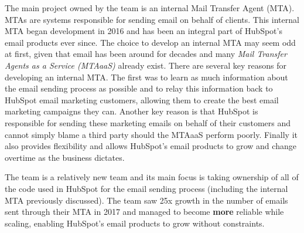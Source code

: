 The main project owned by the \team{} team is an internal Mail Transfer Agent (MTA). MTAs are systems responsible for sending email on behalf of clients. This internal MTA began development in 2016 and has been an integral part of HubSpot's email products ever since. The choice to develop an internal MTA may seem odd at first, given that email has been around for decades and many \textit{Mail Transfer Agents as a Service (MTAaaS)} already exist. There are several key reasons for developing an internal MTA. The first was to learn as much information about the email sending process as possible and to relay this information back to HubSpot email marketing customers, allowing them to create the best email marketing campaigns they can. Another key reason is that HubSpot is responsible for sending these marketing emails on behalf of their customers and cannot simply blame a third party should the MTAaaS perform poorly. Finally it also provides flexibility and allows HubSpot's email products to grow and change overtime as the business dictates.  

The \team{} team is a relatively new team and its main focus is taking ownership of all of the code used in HubSpot for the email sending process (including the internal MTA previously discussed). The team saw 25x growth in the number of emails sent through their MTA in 2017 and managed to become \textbf{more} reliable while scaling, enabling HubSpot's email products to grow without constraints.  